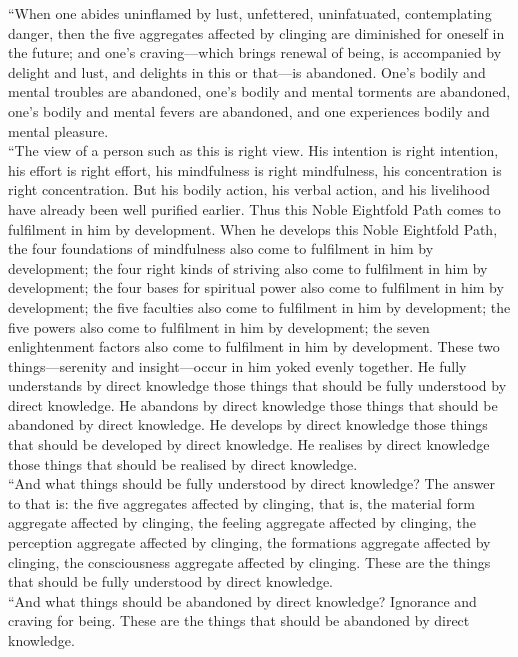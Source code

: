 \documentclass[11pt]{article}
\begin{document}
“When one abides uninflamed by lust, unfettered, uninfatuated, contemplating danger, then the five aggregates affected by clinging are diminished for oneself in the future; and one’s craving—which brings renewal of being, is accompanied by delight and lust, and delights in this or that—is abandoned. One’s bodily and mental troubles are abandoned, one’s bodily and mental torments are abandoned, one’s bodily and mental fevers are abandoned, and one experiences bodily and mental pleasure.\\

“The view of a person such as this is right view. His intention is right intention, his effort is right effort, his mindfulness is right mindfulness, his concentration is right concentration. But his bodily action, his verbal action, and his livelihood have already been well purified earlier. Thus this Noble Eightfold Path comes to fulfilment in him by development. When he develops this Noble Eightfold Path, the four foundations of mindfulness also come to fulfilment in him by development; the four right kinds of striving also come to fulfilment in him by development; the four bases for spiritual power also come to fulfilment in him by development; the five faculties also come to fulfilment in him by development; the five powers also come to fulfilment in him by development; the seven enlightenment factors also come to fulfilment in him by development. These two things—serenity and insight—occur in him yoked evenly together. He fully understands by direct knowledge those things that should be fully understood by direct knowledge. He abandons by direct knowledge those things that should be abandoned by direct knowledge. He develops by direct knowledge those things that should be developed by direct knowledge. He realises by direct knowledge those things that should be realised by direct knowledge.\\

“And what things should be fully understood by direct knowledge? The answer to that is: the five aggregates affected by clinging, that is, the material form aggregate affected by clinging, the feeling aggregate affected by clinging, the perception aggregate affected by clinging, the formations aggregate affected by clinging, the consciousness aggregate affected by clinging. These are the things that should be fully understood by direct knowledge.\\

“And what things should be abandoned by direct knowledge? Ignorance and craving for being. These are the things that should be abandoned by direct knowledge.\\
\end{document}
